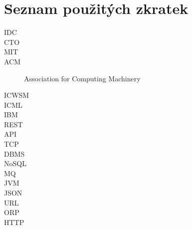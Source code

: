 \documentclass[thesis=M,czech]{FITthesis}[2014/05/07]
\begin{document}
\chapter{Seznam použitých zkratek}
\begin{description}
	\item[IDC] 
	\item[CTO]
	\item[MIT]	
	\item[ACM] Association for Computing Machinery	
	\item[ICWSM]	
	\item[ICML]	
	\item[IBM]	
	\item[REST]	
	\item[API]							
	\item[TCP]
	\item[DBMS]
	\item[NoSQL]
	\item[MQ]
	\item[JVM]
	\item[JSON]
	\item[URL]
	\item[ORP]
	\item[HTTP]
\end{description}
\end{document}
